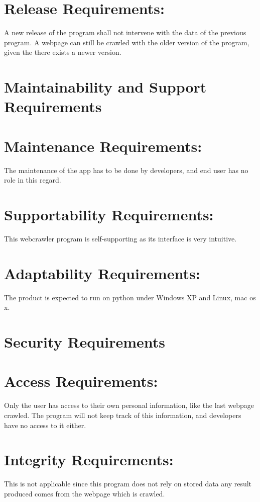 \documentclass[12pt]{article}
\begin{document}
\section*{Release Requirements: }
A new release of the program shall not intervene with the data of the previous program. A webpage can still be crawled with the older version of the program, given the there exists a newer version.

\section*{Maintainability and Support Requirements }

\section*{Maintenance Requirements:}
 The maintenance of the app has to be done by developers, and end user has no role in this regard.

\section*{Supportability Requirements:}

This webcrawler program is self-supporting as its interface is very intuitive.

\section*{Adaptability Requirements:}

The product is expected to run on python under Windows XP and Linux, mac os x. 

\section*{Security Requirements }

\section*{Access Requirements:}
Only the user has access to their own personal information, like the last webpage crawled. The program will not keep track of this information, and developers have no access to it either.

\section*{Integrity Requirements:}
This is not applicable since this program does not rely on stored data any result produced comes from the webpage which is crawled. 
\end{document}
